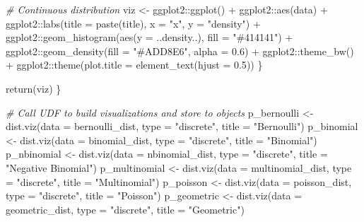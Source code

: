 \documentclass[
]{book}
\newenvironment{Shaded}{\begin{snugshade}}{\end{snugshade}}
\newcommand{\AttributeTok}[1]{\textcolor[rgb]{0.77,0.63,0.00}{#1}}
\newcommand{\CommentTok}[1]{\textcolor[rgb]{0.56,0.35,0.01}{\textit{#1}}}
\newcommand{\FloatTok}[1]{\textcolor[rgb]{0.00,0.00,0.81}{#1}}
\newcommand{\FunctionTok}[1]{\textcolor[rgb]{0.00,0.00,0.00}{#1}}
\newcommand{\NormalTok}[1]{#1}
\newcommand{\OtherTok}[1]{\textcolor[rgb]{0.56,0.35,0.01}{#1}}
\newcommand{\SpecialCharTok}[1]{\textcolor[rgb]{0.00,0.00,0.00}{#1}}
\newcommand{\StringTok}[1]{\textcolor[rgb]{0.31,0.60,0.02}{#1}}
\begin{document}
\begin{Shaded}
\begin{Highlighting}[]
    \CommentTok{\# Continuous distribution}
\NormalTok{    viz }\OtherTok{\textless{}{-}}\NormalTok{ ggplot2}\SpecialCharTok{::}\FunctionTok{ggplot}\NormalTok{() }\SpecialCharTok{+} 
\NormalTok{           ggplot2}\SpecialCharTok{::}\FunctionTok{aes}\NormalTok{(data) }\SpecialCharTok{+} 
\NormalTok{           ggplot2}\SpecialCharTok{::}\FunctionTok{labs}\NormalTok{(}\AttributeTok{title =} \FunctionTok{paste}\NormalTok{(title), }\AttributeTok{x =} \StringTok{"x"}\NormalTok{, }\AttributeTok{y =} \StringTok{"density"}\NormalTok{) }\SpecialCharTok{+} 
\NormalTok{           ggplot2}\SpecialCharTok{::}\FunctionTok{geom\_histogram}\NormalTok{(}\FunctionTok{aes}\NormalTok{(}\AttributeTok{y =}\NormalTok{ ..density..), }\AttributeTok{fill =} \StringTok{"\#414141"}\NormalTok{) }\SpecialCharTok{+}
\NormalTok{           ggplot2}\SpecialCharTok{::}\FunctionTok{geom\_density}\NormalTok{(}\AttributeTok{fill =} \StringTok{"\#ADD8E6"}\NormalTok{, }\AttributeTok{alpha =} \FloatTok{0.6}\NormalTok{) }\SpecialCharTok{+}
\NormalTok{           ggplot2}\SpecialCharTok{::}\FunctionTok{theme\_bw}\NormalTok{() }\SpecialCharTok{+}
\NormalTok{           ggplot2}\SpecialCharTok{::}\FunctionTok{theme}\NormalTok{(}\AttributeTok{plot.title =} \FunctionTok{element\_text}\NormalTok{(}\AttributeTok{hjust =} \FloatTok{0.5}\NormalTok{))}
\NormalTok{  \}}

  \FunctionTok{return}\NormalTok{(viz)}
\NormalTok{\}}

\CommentTok{\# Call UDF to build visualizations and store to objects}
\NormalTok{p\_bernoulli }\OtherTok{\textless{}{-}} \FunctionTok{dist.viz}\NormalTok{(}\AttributeTok{data =}\NormalTok{ bernoulli\_dist, }\AttributeTok{type =} \StringTok{"discrete"}\NormalTok{, }\AttributeTok{title =} \StringTok{"Bernoulli"}\NormalTok{)}
\NormalTok{p\_binomial }\OtherTok{\textless{}{-}} \FunctionTok{dist.viz}\NormalTok{(}\AttributeTok{data =}\NormalTok{ binomial\_dist, }\AttributeTok{type =} \StringTok{"discrete"}\NormalTok{, }\AttributeTok{title =} \StringTok{"Binomial"}\NormalTok{)}
\NormalTok{p\_nbinomial }\OtherTok{\textless{}{-}} \FunctionTok{dist.viz}\NormalTok{(}\AttributeTok{data =}\NormalTok{ nbinomial\_dist, }\AttributeTok{type =} \StringTok{"discrete"}\NormalTok{, }\AttributeTok{title =} \StringTok{"Negative Binomial"}\NormalTok{)}
\NormalTok{p\_multinomial }\OtherTok{\textless{}{-}} \FunctionTok{dist.viz}\NormalTok{(}\AttributeTok{data =}\NormalTok{ multinomial\_dist, }\AttributeTok{type =} \StringTok{"discrete"}\NormalTok{, }\AttributeTok{title =} \StringTok{"Multinomial"}\NormalTok{)}
\NormalTok{p\_poisson }\OtherTok{\textless{}{-}} \FunctionTok{dist.viz}\NormalTok{(}\AttributeTok{data =}\NormalTok{ poisson\_dist, }\AttributeTok{type =} \StringTok{"discrete"}\NormalTok{, }\AttributeTok{title =} \StringTok{"Poisson"}\NormalTok{)}
\NormalTok{p\_geometric }\OtherTok{\textless{}{-}} \FunctionTok{dist.viz}\NormalTok{(}\AttributeTok{data =}\NormalTok{ geometric\_dist, }\AttributeTok{type =} \StringTok{"discrete"}\NormalTok{, }\AttributeTok{title =} \StringTok{"Geometric"}\NormalTok{)}
  

\end{Highlighting}
\end{Shaded}
\end{document}
